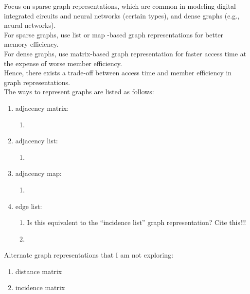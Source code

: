 Focus on sparse graph representations, which are common in modeling digital integrated circuits and neural networks (certain types), and dense graphs (e.g., neural networks). \\

For sparse graphs, use list or map -based graph representations for better memory efficiency. \\

For dense graphs, use matrix-based graph representation for faster access time at the expense of worse member efficiency. \\

Hence, there exists a trade-off between access time and member efficiency in graph representations.\\

The ways to represent graphs are listed as follows: \vspace{-0.3cm}
\begin{enumerate} \itemsep -4pt
\item adjacency matrix: \vspace{-0.3cm}
	\begin{enumerate} \itemsep -2pt
	\item 
	\end{enumerate}
\item adjacency list: \vspace{-0.3cm}
	\begin{enumerate} \itemsep -2pt
	\item 
	\end{enumerate}
\item adjacency map: \vspace{-0.3cm}
	\begin{enumerate} \itemsep -2pt
	\item 
	\end{enumerate}
\item edge list: \vspace{-0.3cm}
	\begin{enumerate} \itemsep -2pt
	\item Is this equivalent to the ``incidence list'' graph representation? {\Huge Cite this!!!}
	\item 
	\end{enumerate}
\end{enumerate}


Alternate graph representations that I am not exploring: \vspace{-0.3cm}
\begin{enumerate} \itemsep -4pt
\item distance matrix
\item incidence matrix
\end{enumerate}









